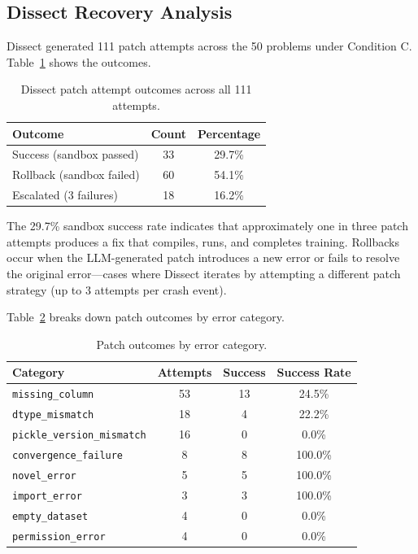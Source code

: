 \documentclass[conference]{IEEEtran}
\begin{document}
\subsection{Dissect Recovery Analysis}

Dissect generated 111 patch attempts across the 50 problems under Condition C.
Table~\ref{tab:patch_outcomes} shows the outcomes.

\begin{table}[ht]
  \centering
  \small
  \caption{Dissect patch attempt outcomes across all 111 attempts.}
  \label{tab:patch_outcomes}
  \begin{tabular}{lcc}
  \toprule
  \textbf{Outcome} & \textbf{Count} & \textbf{Percentage} \\
  \midrule
  Success (sandbox passed) & 33 & 29.7\% \\
  Rollback (sandbox failed) & 60 & 54.1\% \\
  Escalated (3 failures) & 18 & 16.2\% \\
  \bottomrule
  \end{tabular}
\end{table}

The 29.7\% sandbox success rate indicates that approximately one in three patch attempts
produces a fix that compiles, runs, and completes training. Rollbacks occur when the
LLM-generated patch introduces a new error or fails to resolve the original error---cases
where Dissect iterates by attempting a different patch strategy (up to 3 attempts per
crash event).

Table~\ref{tab:patch_categories} breaks down patch outcomes by error category.

\begin{table}[ht]
  \centering
  \small
  \caption{Patch outcomes by error category.}
  \label{tab:patch_categories}
  \begin{tabular}{lccc}
  \toprule
  \textbf{Category} & \textbf{Attempts} & \textbf{Success} & \textbf{Success Rate} \\
  \midrule
  \texttt{missing\_column} & 53 & 13 & 24.5\% \\
  \texttt{dtype\_mismatch} & 18 & 4 & 22.2\% \\
  \texttt{pickle\_version\_mismatch} & 16 & 0 & 0.0\% \\
  \texttt{convergence\_failure} & 8 & 8 & 100.0\% \\
  \texttt{novel\_error} & 5 & 5 & 100.0\% \\
  \texttt{import\_error} & 3 & 3 & 100.0\% \\
  \texttt{empty\_dataset} & 4 & 0 & 0.0\% \\
  \texttt{permission\_error} & 4 & 0 & 0.0\% \\
  \bottomrule
  \end{tabular}
\end{table}
\end{document}
